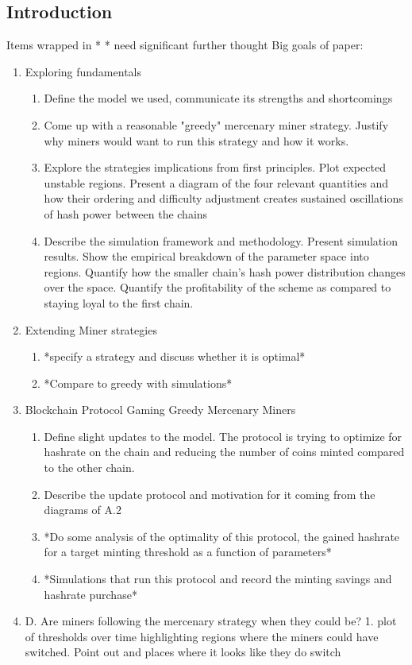 \documentclass[12pt, preprint]{aastex}
\begin{document}
\subsection{Introduction} 
Items wrapped in * * need significant further thought
Big goals of paper:
\begin{enumerate}
\item
Exploring fundamentals
\begin{enumerate}
\item
Define the model we used, communicate its strengths and shortcomings
\item
Come up with a reasonable "greedy" mercenary miner strategy. Justify why miners would want to run this strategy and how it works.
\item
Explore the strategies implications from first principles.  Plot expected unstable regions.  Present a diagram of the four relevant quantities and how their ordering and difficulty adjustment creates sustained oscillations of hash power between the chains
\item
Describe the simulation framework and methodology.  Present simulation results.  Show the empirical breakdown of the parameter space into regions.  Quantify how the smaller chain's hash power distribution changes over the space.  Quantify the profitability of the scheme as compared to staying loyal to the first chain.
\end{enumerate}
\item
Extending Miner strategies
\begin{enumerate}
\item
*specify a strategy and discuss whether it is optimal*
\item
*Compare to greedy with simulations*
\end{enumerate}
\item
 Blockchain Protocol Gaming Greedy Mercenary Miners
 \begin{enumerate}
 \item
Define slight updates to the model.  The protocol is trying to optimize for hashrate on the chain and reducing the number of coins minted compared to the other chain.
\item
Describe the update protocol and motivation for it coming from the diagrams of A.2
\item
*Do some analysis of the optimality of this protocol, the gained hashrate for a target minting threshold as a function of parameters*
\item
*Simulations that run this protocol and record the minting savings and hashrate purchase*
\end{enumerate}

\item
D. Are miners following the mercenary strategy when they could be?
1. plot of thresholds over time highlighting regions where the miners could have switched.  Point out and places where it looks like they do switch
\end{enumerate}
\end{document}
